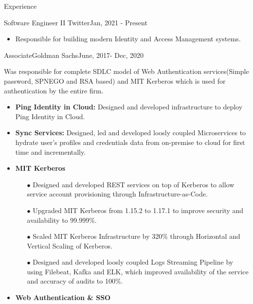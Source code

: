 \documentclass[]{mcdowellcv}
\begin{document}
\makeheader
\begin{cvsection}{Experience}
    \begin{cvsubsection}{Software Engineer II} {Twitter}{Jan, 2021 - Present}
    \begin{itemize}%
        \item Responsible for building modern Identity and Access Management systems.
    \end{itemize}
    \end{cvsubsection}
	\begin{cvsubsection}{Associate}{Goldman Sachs}{June, 2017- Dec, 2020}
		            
		
		    Was responsible for complete SDLC model of Web Authentication services(Simple password, SPNEGO and RSA based)  and MIT Kerberos which is used for authentication by the entire firm.
	\begin{itemize}%
	        \item \textbf{Ping Identity in Cloud:} Designed and developed infrastructure to deploy Ping Identity in Cloud.
		    \item \textbf{Sync Services:} Designed, led and developed loosly coupled Microservices to hydrate user's profiles and credentials data from on-premise to cloud for first time and incrementally.
		    
		    \item \textbf{MIT Kerberos}
		    \begin{itemize}%
		    \item  [$\bullet$] Designed and developed REST services on top of Kerberos to allow service account provisioning through Infrastructure-as-Code.
		    \item [$\bullet$] Upgraded MIT Kerberos from 1.15.2 to 1.17.1 to improve security and availability to 99.999\%.
		    \item [$\bullet$] Scaled MIT Kerberos Infrastructure by 320\% through Horizontal and Vertical Scaling of Kerberos.
		    \item [$\bullet$] Designed and developed loosly coupled Logs Streaming Pipeline by using Filebeat, Kafka and ELK, which improved availability of the service and accuracy of audits to  100\%. 
		    \end{itemize}
		    
		     \item  \textbf{Web Authentication \& SSO}
		    \begin{itemize}%
		    

\end{itemize}
\end{itemize}
\end{cvsubsection}
\end{cvsection}
\end{document}
